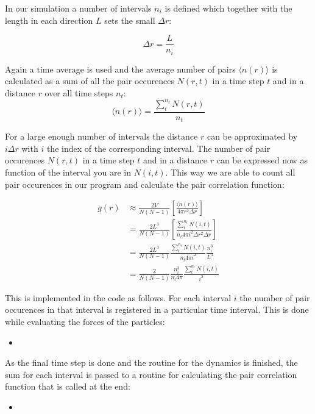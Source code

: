 \documentclass[
10pt, %
a4paper, %
oneside, %
headinclude,footinclude, %
BCOR5mm, %
]{scrartcl}
\newcommand{\insertcode}[2]{\begin{itemize}\item[]\end{itemize}} %
\begin{document}
\noindent
In our simulation a number of intervals $n_i$ is defined which together with the length in each direction $L$ sets the small $\Delta r$:

$$ \Delta r  = \frac{L}{n_i} $$

\noindent
Again a time average is used and the average number of pairs $\langle n(r) \rangle $ is calculated as a sum of all the pair occurences $N(r,t)$ in a time step $t$ and in a distance $r$ over all time steps $n_t$:
$$ \langle n(r) \rangle = \frac{\sum_t^{n_t} N(r,t)}{n_t} $$

\noindent
For a large enough number of intervals the distance $r$ can be approximated by $i\Delta r$ with $i$ the index of the corresponding interval. The number of pair occurences $N(r,t)$ in a time step $t$ and in a distance $r$ can be expressed now as function of the interval you are in $N(i,t)$. This way we are able to count all pair occurences in our program and calculate the pair correlation function:

\begin{align}
g(r) &\approx \frac{2V}{N(N-1)} \left [ \frac{\langle n(r) \rangle }{ 4 \pi r^2 \Delta r} \right ] \\
&= \frac{2L^3}{N(N-1)} \left [ \frac{\sum_t^{n_t} N(i,t)}{n_t 4 \pi i^2 \Delta r^2 \Delta r} \right ] \\
&= \frac{2L^3}{N(N-1)} \frac{\sum_t^{n_t} N(i,t)}{n_t 4 \pi i^2} \frac{n_i^3}{L^3} \\
&= \frac{2}{N(N-1)} \frac{n_i^3}{n_t 4 \pi} \frac{\sum_t^{n_t} N(i,t)}{i^2}
\end{align}

\noindent
This is implemented in the code as follows. For each interval $i$ the number of pair occurences in that interval is registered in a particular time interval. This is done while evaluating the forces of the particles:
\insertcode{"Scripts/pair_correlation_snippet_1.f90"}{Updating the histogram for each interval} %

\noindent
As the final time step is done and the routine for the dynamics is finished, the sum for each interval is passed to a routine for calculating the pair correlation function that is called at the end:
\insertcode{"Scripts/pair_correlation_snippet_2.f90"}{Factors are needed to prevent overflow errors} %
\end{document}
